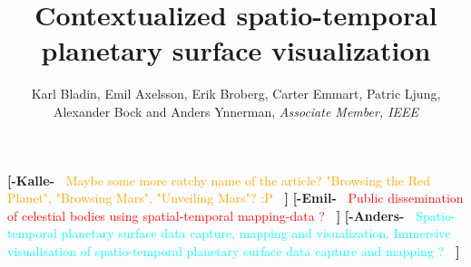 \documentclass[journal]{vgtc}                %
\title{Contextualized spatio-temporal planetary surface visualization}
\author{Karl Bladin, Emil Axelsson, Erik Broberg, Carter Emmart, Patric Ljung, \\ Alexander Bock and Anders Ynnerman, \textit{Associate Member, IEEE}}
\newcommand{\kallecomment}[1]{\textbf{[-Kalle-~}
    \textcolor{orange}{#1}
    \textbf{~]}}
\newcommand{\emilcomment}[1]{\textbf{[-Emil-~}
    \textcolor{red}{#1}
    \textbf{~]}}
\newcommand{\anderscomment}[1]{\textbf{[-Anders-~}
    \textcolor{cyan}{#1}
    \textbf{~]}}
\begin{document}

 \label{sec:introduction}
\maketitle
\kallecomment{Maybe some more catchy name of the article? "Browsing the Red Planet", "Browsing Mars", "Unveiling Mars"? :P}
\emilcomment{Public dissemination of celestial bodies using spatial-temporal mapping-data ?}
\anderscomment{Spatio-temporal planetary surface data capture, mapping and visualization, 
Immersive visualisation of spatio-temporal planetary surface data capture and mapping ?}
\end{document}
